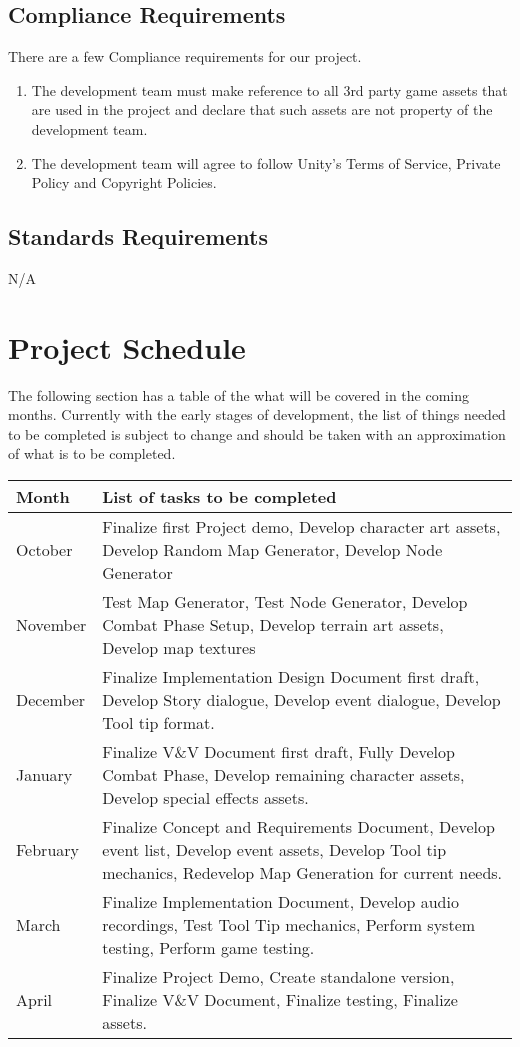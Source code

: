 \documentclass{article}
\begin{document}
\subsection{Compliance Requirements}
\quad There are a few Compliance requirements for our project.
\begin{enumerate}[{COMPR}1. ]
	\item The development team must make reference to all 3rd party game assets that are used in the project and declare that such assets are not property of the development team.
	\item The development team will agree to follow Unity's Terms of Service, Private Policy and Copyright Policies.
\end{enumerate}
\subsection{Standards Requirements}
\quad N/A %
\section{Project Schedule}
\quad The following section has a table of the what will be covered in the coming months. Currently with the early stages of development, the list of things needed to be completed is subject to change and should be taken with an approximation of what is to be completed.
\begin{center}
\begin{tabular}{ | m{5em} | m{10cm}|} 
\hline
Month & List of tasks to be completed \\ 
\hline
October & Finalize first Project demo, Develop character art assets, Develop Random Map Generator, Develop Node Generator \\ 
\hline
November & Test Map Generator, Test Node Generator, Develop Combat Phase Setup, Develop terrain art assets, Develop map textures \\ 
\hline
December & Finalize Implementation Design Document first draft, Develop Story dialogue, Develop event dialogue, Develop Tool tip format. \\ 
\hline
January &  Finalize V\&V Document first draft, Fully Develop Combat Phase, Develop remaining character assets, Develop special effects assets. \\ 
\hline
February & Finalize Concept and Requirements Document, Develop event list, Develop event assets, Develop Tool tip mechanics, Redevelop Map Generation for current needs. \\ 
\hline
March & Finalize Implementation Document, Develop audio recordings, Test Tool Tip mechanics, Perform system testing, Perform game testing.\\ 
\hline
April & Finalize Project Demo, Create standalone version, Finalize V\&V Document, Finalize testing, Finalize assets. \\ 
\hline
\end{tabular}
\end{center}
\end{document}
